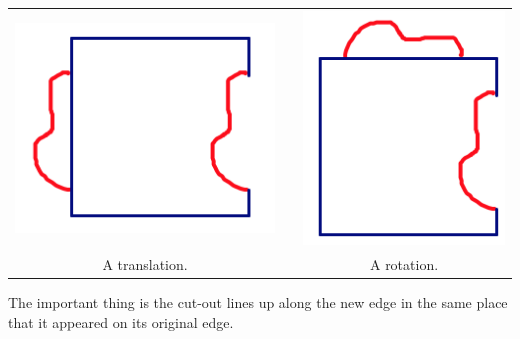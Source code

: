 \documentclass[12pt, reqno]{amsart}
\theoremstyle{remark}
\theoremstyle{definition}
\numberwithin{equation}{section}  %
\begin{document}
\begin{enumerate}
\begin{center}
\begin{tabular}{ccc}
\includegraphics[scale=0.5]{eschdirect2} & \qquad\qquad& \includegraphics[scale=0.5]{eschdirect3}\\
A translation.  && A rotation.\\
\end{tabular}

\end{center}
The important thing is the cut-out lines up along the new edge in the same place that it appeared on its original edge.\\



\end{enumerate}
\end{document}
